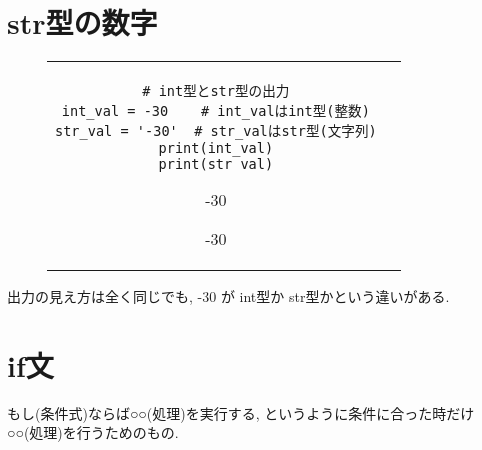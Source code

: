 \documentclass[dvipdfmx]{jsbook}
\newcommand{\countup}[1]{\setcounter{chapter}{#1} \setcounter{section}{0}}
\newcommand{\info}[2]{\begin{tcolorbox}[colframe=gray, colback=black!10!white, coltitle=white, fonttitle=\bfseries, title={#1}]
{#2}\end{tcolorbox}}
\begin{document}
\section{str型の数字}
\begin{figure}[htp]
	\begin{tabular}{cc}
		\begin{minipage}{.45\textwidth}
			\begin{lstlisting}[caption=int型とstr型]
# int型とstr型の出力
int_val = -30    # int_valはint型(整数)
str_val = '-30'  # str_valはstr型(文字列)
print(int_val)
print(str_val)
\end{lstlisting}
		\end{minipage} \hspace{5truemm}
		\begin{minipage}{.3\textwidth}
			\info{出力}{-30 \par -30}
		\end{minipage}
	\end{tabular}
\end{figure}
\info{説明}{出力の見え方は全く同じでも, -30 が int型か str型かという違いがある.}
\newpage

\section*{if文}
\countup{4}
もし(条件式)ならば○○(処理)を実行する, というように条件に合った時だけ ○○(処理)を行うためのもの.
\end{document}
